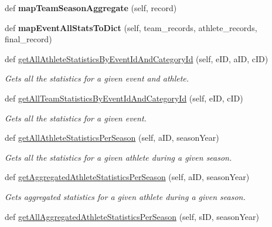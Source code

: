 \begin{DoxyCompactItemize}
def {\bfseries map\+Team\+Season\+Aggregate} (self, record)
\item 
\mbox{\label{classhandler_1_1medal__based__event_1_1_medal_based_event_handler_a58bd406f91bb37943a57752a49dda9ff}} 
def {\bfseries map\+Event\+All\+Stats\+To\+Dict} (self, team\+\_\+records, athlete\+\_\+records, final\+\_\+record)
\item 
def \hyperlink{classhandler_1_1medal__based__event_1_1_medal_based_event_handler_aca6e718ba806e512d839cc373e7ca438}{get\+All\+Athlete\+Statistics\+By\+Event\+Id\+And\+Category\+Id} (self, e\+ID, a\+ID, c\+ID)
\begin{DoxyCompactList}\small\item\em Gets all the statistics for a given event and athlete. \end{DoxyCompactList}\item 
def \hyperlink{classhandler_1_1medal__based__event_1_1_medal_based_event_handler_a1eee8b54acc90b9bdae7ce8729f50b4f}{get\+All\+Team\+Statistics\+By\+Event\+Id\+And\+Category\+Id} (self, e\+ID, c\+ID)
\begin{DoxyCompactList}\small\item\em Gets all the statistics for a given event. \end{DoxyCompactList}\item 
def \hyperlink{classhandler_1_1medal__based__event_1_1_medal_based_event_handler_a21feafbd098a3154cceb30850c5206a4}{get\+All\+Athlete\+Statistics\+Per\+Season} (self, a\+ID, season\+Year)
\begin{DoxyCompactList}\small\item\em Gets all the statistics for a given athlete during a given season. \end{DoxyCompactList}\item 
def \hyperlink{classhandler_1_1medal__based__event_1_1_medal_based_event_handler_aec588df72bb9e9caa0ff1f84348be2e5}{get\+Aggregated\+Athlete\+Statistics\+Per\+Season} (self, a\+ID, season\+Year)
\begin{DoxyCompactList}\small\item\em Gets aggregated statistics for a given athlete during a given season. \end{DoxyCompactList}\item 
def \hyperlink{classhandler_1_1medal__based__event_1_1_medal_based_event_handler_aa8fa362bc23391c161bf5686adb9a3b3}{get\+All\+Aggregated\+Athlete\+Statistics\+Per\+Season} (self, s\+ID, season\+Year)

\end{DoxyCompactItemize}
